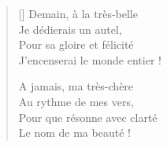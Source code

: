 \settowidth{\versewidth}{J'encenserai le monde entier !}
\begin{verse}[\versewidth]
Demain, à la très-belle \\
Je dédierais un autel, \\
Pour sa gloire et félicité \\
J'encenserai le monde entier !

A jamais, ma très-chère \\
Au rythme de mes vers, \\
Pour que résonne avec clarté \\
Le nom de ma beauté !

\end{verse}






